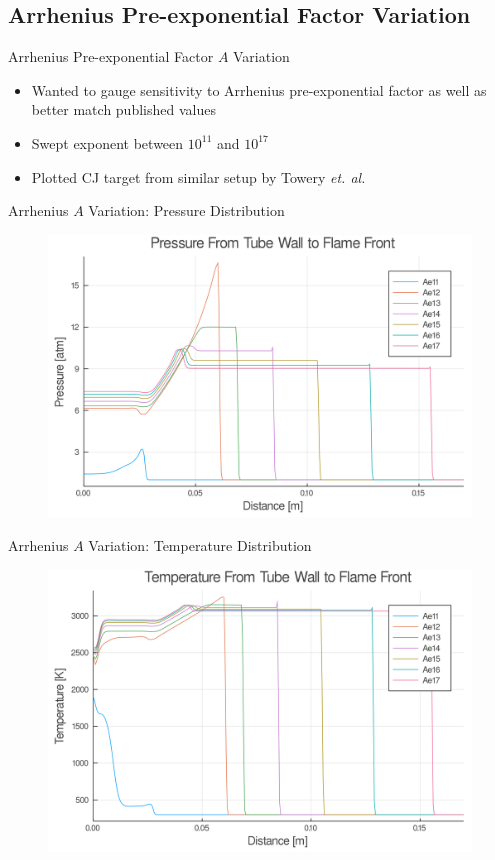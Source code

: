 \subsection{Arrhenius Pre-exponential Factor Variation}

\begin{frame}{Arrhenius Pre-exponential Factor $A$ Variation}
\begin{itemize}
\item Wanted to gauge sensitivity to Arrhenius pre-exponential factor as well as better match published values 
\item Swept exponent between $10^{11}$ and $10^{17}$ 
\item Plotted CJ target from similar setup by Towery \textit{et. al.} \cite{towery1}
\end{itemize}
\end{frame}

\begin{frame}{Arrhenius $A$ Variation: Pressure Distribution}
\begin{figure}
\centering
\includegraphics[width=0.8\linewidth]{../figs/Atest/p.png}
\end{figure}
\end{frame}

\begin{frame}{Arrhenius $A$ Variation: Temperature Distribution}
\begin{figure}
\centering
\includegraphics[width=0.8\linewidth]{../figs/Atest/t.png}
\end{figure}
\end{frame}

